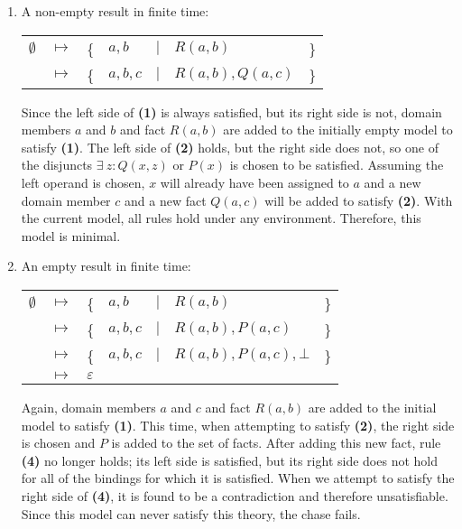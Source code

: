 		\begin{enumerate}
		\item A non-empty result in finite time:

			\begin{tabular}{lllllll}
				$\emptyset$ & $\mapsto$ & \{ & $a,b$   & $|$ & $R(a,b)$         & \} \\
				{}          & $\mapsto$ & \{ & $a,b,c$ & $|$ & $R(a,b), Q(a,c)$ & \} \\
			\end{tabular}

			Since the left side of \textbf{(1)} is always satisfied, but its
			right side is not, domain members $a$ and $b$ and fact $R(a,b)$ are
			added to the initially empty model to satisfy \textbf{(1)}. The
			left side of \textbf{(2)} holds, but the right side does not, so
			one of the disjuncts $\exists\ z : Q(x,z)$ or $P(x)$ is chosen to
			be satisfied. Assuming the left operand is chosen, $x$ will already
			have been assigned to $a$ and a new domain member $c$ and a new
			fact $Q(a,c)$ will be added to satisfy \textbf{(2)}. With the
			current model, all rules hold under any environment. Therefore,
			this model is minimal.

		\item An empty result in finite time:

			\begin{tabular}{lllllll}
				$\emptyset$ & $\mapsto$ & \{ & $a,b$   & $|$ & $R(a,b)$               & \} \\
				{}          & $\mapsto$ & \{ & $a,b,c$ & $|$ & $R(a,b), P(a,c)$       & \} \\
				{}          & $\mapsto$ & \{ & $a,b,c$ & $|$ & $R(a,b), P(a,c), \bot$ & \} \\
				{}          & $\mapsto$ & \multicolumn{5}{l}{ $\varepsilon$ }              \\
			\end{tabular}

			Again, domain members $a$ and $c$ and fact $R(a,b)$ are added to
			the initial model to satisfy \textbf{(1)}.  This time, when
			attempting to satisfy \textbf{(2)}, the right side is chosen and
			$P$ is added to the set of facts. After adding this new fact, rule
			\textbf{(4)} no longer holds; its left side is satisfied, but its
			right side does not hold for all of the bindings for which it is
			satisfied. When we attempt to satisfy the right side of
			\textbf{(4)}, it is found to be a contradiction and therefore
			unsatisfiable. Since this model can never satisfy this theory, the
			chase fails.


\end{enumerate}
